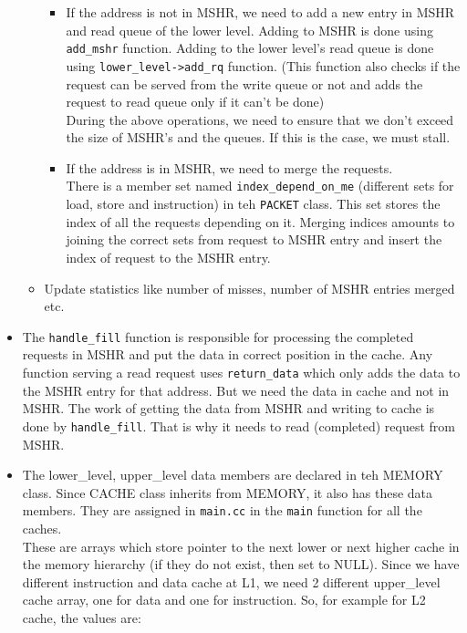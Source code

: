 \documentclass[11pt, swedish, openany]{book}
\begin{document}
\begin{itemize}
\begin{itemize}
        \begin{itemize}
            \item If the address is not in MSHR, we need to add a new entry in MSHR and read queue of the lower level. Adding to MSHR is done using \texttt{add\_mshr} function. Adding to the lower level's read queue is done using \texttt{lower\_level->add\_rq} function. (This function also checks if the request can be served from the write queue or not and adds the request to read queue only if it can't be done)\\
            During the above operations, we need to ensure that we don't exceed the size of MSHR's and the queues. If this is the case, we must stall.
            \item If the address is in MSHR, we need to merge the requests.\\
            There is a member set named  \texttt{index\_depend\_on\_me} (different sets for load, store and instruction) in teh \texttt{PACKET} class. This set stores the index of all the requests depending on it. Merging indices amounts to joining the correct sets from request to MSHR entry and insert the index of request to the MSHR entry.
        \end{itemize}
        \item Update statistics like number of misses, number of MSHR entries merged etc.
    \end{itemize}
    \item The \texttt{handle\_fill} function is responsible for processing the completed requests in MSHR and put the data in correct position in the cache. Any function serving a read request uses \texttt{return\_data} which only adds the data to the MSHR entry for that address. But we need the data in cache and not in MSHR. The work of getting the data from MSHR and writing to cache is done by \texttt{handle\_fill}. That is why it needs to read (completed) request from MSHR.
    \item The lower\_level, upper\_level data members are declared in teh MEMORY class. Since CACHE class inherits from MEMORY, it also has these data members. They are assigned in \texttt{main.cc} in the \texttt{main} function for all the caches.\\
    These are arrays which store pointer to the next lower or next higher cache in the memory hierarchy (if they do not exist, then set to NULL). Since we have different instruction and data cache at L1, we need 2 different upper\_level cache array, one for data and one for instruction. So, for example for L2 cache, the values are:\\

\end{itemize}
\end{document}
